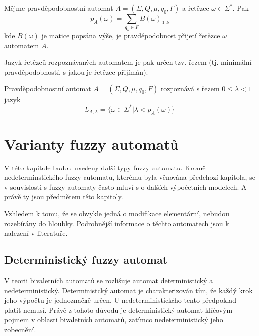 \documentclass[a4paper,10pt]{article}
\begin{document}
\begin{definition}
 Mějme pravděpodobnostní automat $A = (\Sigma, Q, \mu, q_0, F)$ a řetězec $\omega \in \Sigma^*$. Pak 
 $$
  p_A(\omega) = \sum_{q_k \in F} B(\omega)_{0, k}
 $$ 
 kde $B(\omega)$ je matice popsána výše, je pravděpodobnost přijetí řetězce $\omega$ automatem $A$.
\end{definition}

Jazyk řetězců rozpoznávaných automatem je pak určen tzv. řezem (tj. minimální pravděpodobností, s jakou je řetězec přijímán).
\begin{definition}
 Pravděpodobnostní automat $A = (\Sigma, Q, \mu, q_0, F)$ rozpoznává s řezem $0 \leq \lambda < 1$ jazyk
 $$
  L_{A,\lambda} = \{ \omega \in \Sigma^* | \lambda < p_A(\omega) \}
 $$
\end{definition}





\section{Varianty fuzzy automatů}
V této kapitole budou uvedeny další typy fuzzy automatu. Kromě nedeterminstického fuzzy automatu, kterému byla věnována předchozí kapitola, se v souvislosti s fuzzy automaty často mluví s o dalších výpočetních modelech. A právě ty jsou předmětem této kapitoly. 

Vzhledem k tomu, že se obvykle jedná o modifikace elementární, nebudou rozebírány do hloubky. Podrobnější informace o těchto automatech jsou k nalezení v literatuře.

\subsection{Deterministický fuzzy automat}
V teorii  bivaletních automatů se rozlišuje automat deterministický a nedeterministický. Deterministcký automat je charakterizován tím, že každý krok jeho výpočtu je jednoznačně určen. U nedeterministického tento předpoklad platit nemusí. Právě z tohoto důvodu je deterministický automat klíčovým pojmem v oblasti  bivaletních automatů, zatímco nedeterministický jeho zobecnění.
\end{document}
